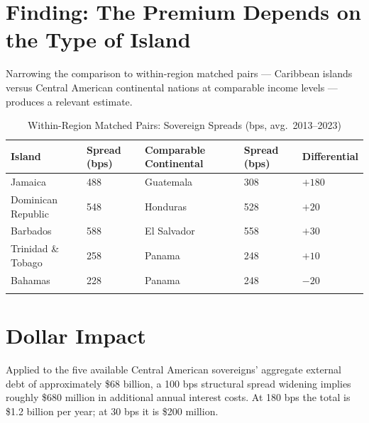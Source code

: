 \documentclass[11pt, a4paper]{article}
\begin{document}
\section{Finding: The Premium Depends on the Type of Island}

Narrowing the comparison to within-region matched pairs --- Caribbean islands versus Central American continental nations at comparable income levels --- produces a relevant estimate.

\begin{table}[H]
\centering
\caption{Within-Region Matched Pairs: Sovereign Spreads (bps, avg.\ 2013--2023)}
\label{tab:matched}
\begin{tabular}{lC{2cm}lC{2.2cm}C{2cm}}
\toprule
Island & Spread (bps) & Comparable Continental & Spread (bps) & Differential \\
\midrule
Jamaica             & 488 & Guatemala   & 308 & $+180$ \\
Dominican Republic  & 548 & Honduras    & 528 & $+20$  \\
Barbados            & 588 & El Salvador & 558 & $+30$  \\
Trinidad \& Tobago  & 258 & Panama      & 248 & $+10$  \\
Bahamas             & 228 & Panama      & 248 & $-20$  \\
\midrule
{} & \\
\end{tabular}
\end{table}

\section{Dollar Impact}

Applied to the five available Central American sovereigns' aggregate external debt of approximately \$68 billion, a 100 bps structural spread widening implies roughly \$680 million in additional annual interest costs. At 180 bps the total is \$1.2 billion per year; at 30 bps it is \$200 million.
\end{document}
